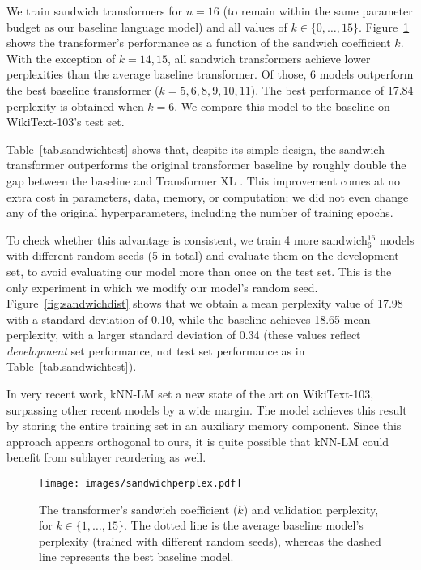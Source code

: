 \documentclass[11pt,a4paper]{article}
\begin{document}
We train sandwich transformers for $n=16$ (to remain within the same parameter budget as our baseline language model) and all values of $k \in \{0, \ldots ,15\}$. Figure~\ref{fig.sandwichperplexity} shows the transformer's performance as a function of the sandwich coefficient $k$. 
With the exception of $k=14,15$, all sandwich transformers achieve lower perplexities than the average baseline transformer.
Of those, 6 models outperform the best baseline transformer ($k=5,6,8,9,10,11$).
The best performance of 17.84 perplexity is obtained when $k = 6$.
We compare this model to the baseline on WikiText-103's test set.

Table~\ref{tab.sandwichtest} shows that, despite its simple design, the sandwich transformer outperforms the original transformer baseline by roughly double the gap between the baseline \cite{baevski2018adaptive} and Transformer XL \cite{transformerXL}.
This improvement comes at no extra cost in parameters, data, memory, or computation; we did not even change any of the original hyperparameters, including the number of training epochs. 

To check whether this advantage is consistent, we train 4 more sandwich$_6^{16}$ models with different random seeds (5 in total) and evaluate them on the development set, to avoid evaluating our model more than once on the test set. This is the only experiment in which we modify our model's random seed.
Figure~\ref{fig:sandwichdist} shows that we obtain a mean perplexity value of 17.98 with a standard deviation of 0.10, while the baseline achieves 18.65 mean perplexity, with a larger standard deviation of 0.34 (these values reflect \emph{development} set performance, not test set performance as in Table~\ref{tab.sandwichtest}).

In very recent work, kNN-LM \cite{urvashi} set a new state of the art on WikiText-103, surpassing other recent models by a wide margin. The model achieves this result by storing the entire training set in an auxiliary memory component. Since this approach appears orthogonal to ours, it is quite possible that kNN-LM could benefit from sublayer reordering as well.


\begin{figure}[t]
\centering
\texttt{[image: images/sandwichperplex.pdf]}
\caption{The transformer's sandwich coefficient ($k$) and validation perplexity, for  $k \in \{1,\dots,15\}$. The dotted line is the average baseline model's perplexity (trained with different random seeds), whereas the dashed line represents the best baseline model.} 
\label{fig.sandwichperplexity}
\end{figure}
\end{document}
